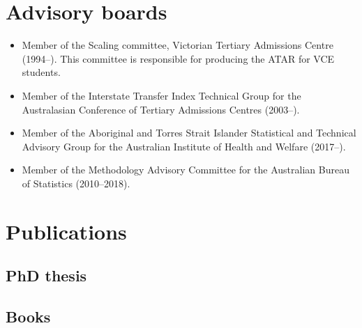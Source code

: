 \documentclass[10pt,a4paper,]{article}
\providecommand{\tightlist}{%
  \setlength{\itemsep}{0pt}\setlength{\parskip}{0pt}}
\newcounter{papers}
\begin{document}
\hypertarget{advisory-boards}{%
\section{Advisory boards}\label{advisory-boards}}

\begin{itemize}
\tightlist
\item
  Member of the Scaling committee, Victorian Tertiary Admissions Centre (1994--). This committee is responsible for producing the ATAR for VCE students.
\item
  Member of the Interstate Transfer Index Technical Group for the Australasian Conference of Tertiary Admissions Centres (2003--).
\item
  Member of the Aboriginal and Torres Strait Islander Statistical and Technical Advisory Group for the Australian Institute of Health and Welfare (2017--).
\item
  Member of the Methodology Advisory Committee for the Australian Bureau of Statistics (2010--2018).
\end{itemize}

\newpage

\hypertarget{publications}{%
\section{Publications}\label{publications}}

\hypertarget{phd-thesis}{%
\subsection{PhD thesis}\label{phd-thesis}}

\label{papersstart}
\newrefcontext[sorting=ynt]\setcounter{papers}{0}\pagebreak[3]\printbibliography[category=bibRefereed journal papers,heading=bibRefereed journal papers]\setcounter{papers}{0}

\nocite{phd}

\hypertarget{books}{%
\subsection{Books}\label{books}}

\newrefcontext[sorting=ynt]\setcounter{papers}{0}\pagebreak[3]
\printbibliography[category=bibRefereed journal papers,heading=bibRefereed journal papers]\setcounter{papers}{0}
\end{document}
